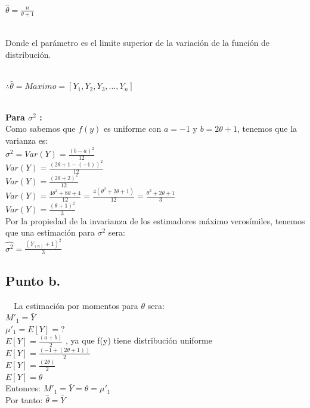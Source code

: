 \documentclass[letterpaper,12pt,onecolumn,titlepage]{article}
\begin{document}
~\\ $\hat{\theta} = \frac{n}{\theta+1}$

~\\ Donde el par\'{a}metro es el limite superior de la variaci\'{o}n de la funci\'{o}n de distribuci\'{o}n. 

~\\ $\therefore \hat{\theta} = Maximo = [Y_{1}, Y_{2}, Y_{3},...,Y_{n}]$ 

~\\ \textbf{Para $\sigma^{2}$ :}
~\\ Como sabemos que $f(y)$ es uniforme con $a=-1$ y $b=2\theta+1$, tenemos que la varianza es:
~\\ $\sigma^{2} = Var(Y) = \frac{(b-a)^2}{12}$
~\\ $Var(Y) = \frac{(2\theta+1-(-1))^2}{12}$
~\\ $Var(Y) = \frac{(2\theta+2)^2}{12}$
~\\ $Var(Y) = \frac{4\theta^2 +8\theta+4}{12}=\frac{4(\theta^2 +2\theta+1)}{12}=\frac{\theta^2 +2\theta+1}{3}$
~\\ $Var(Y) = \frac{(\theta+1)^2}{3}$
~\\ Por la propiedad de la invarianza de los estimadores m\'{a}ximo veros\'{i}miles, tenemos que una estimaci\'{o}n para $\sigma^2$ sera:
~\\ $\hat{\sigma^2}=\frac{(Y_{(n)}+1)^2}{3}$

\subsection{Punto b.}
~\ La estimaci\'{o}n por momentos para $\theta$ sera:
~\\ $M'_1=\bar{Y}$
~\\ $\mu'_1=E[Y]=?$
~\\ $E[Y]= \frac{(a+b)}{2}$  , ya que f(y) tiene distribuci\'{o}n uniforme
~\\ $E[Y]= \frac{(-1+(2\theta+1))}{2}$
~\\ $E[Y]= \frac{(2\theta)}{2}$
~\\ $E[Y]= \theta$
~\\ Entonces: $M'_1=\bar{Y}=\theta=\mu'_1$
~\\ Por tanto: $\hat{\theta}=\bar{Y}$


\end{document}
